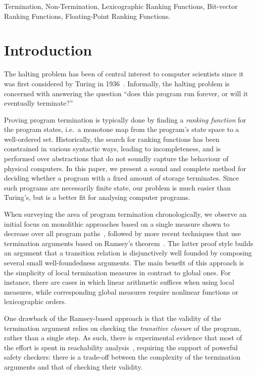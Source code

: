 \documentclass[a4paper]{llncs}
\begin{document}

\keywords
Termination, Non-Termination, 
Lexicographic Ranking Functions, Bit-vector Ranking Functions, Floating-Point Ranking Functions.



\section{Introduction}\label{sec:intro}

The halting problem has been of central interest to computer scientists
since it was first considered by Turing in 1936~\cite{turing}.  Informally,
the halting problem is concerned with answering the question
``does this program run forever, or will it eventually terminate?''

Proving program termination is typically done by finding a \emph{ranking
function} for the program states, i.e.~a monotone map from the program's
state space to a well-ordered set.  Historically, the search for ranking
functions has been constrained in various syntactic ways, leading to
incompleteness, and is performed over abstractions that do not soundly
capture the behaviour of physical computers.  In this paper, we present a
sound and complete method for deciding whether a program with a fixed amount of
storage terminates.  Since such programs are necessarily finite state, our
problem is much easier than Turing's, but is a better fit for analysing computer
programs.

When surveying the area of program termination chronologically, we observe
an initial focus on monolithic approaches based on a single measure shown to
decrease over all program
paths~\cite{DBLP:conf/vmcai/P04,DBLP:conf/cav/BradleyMS05}, followed by more
recent techniques that use termination arguments based on Ramsey's
theorem~\cite{DBLP:conf/lpe/CodishG03,DBLP:conf/lics/PodelskiR04,DBLP:conf/pldi/CookPR06}.
The latter proof style builds an argument that a transition relation is disjunctively well founded
by composing several small well-foundedness arguments.
The main benefit of this approach is
the simplicity of local termination measures in contrast to global ones. 
For instance, there are cases in which linear arithmetic suffices when using
local measures, while corresponding global measures require nonlinear
functions or lexicographic orders.

One drawback of the Ramsey-based approach is that the validity of the
termination argument relies on checking the \emph{transitive closure} of the
program, rather than a single step.  As such, there is experimental evidence
that most of the effort is spent in reachability
analysis~\cite{DBLP:conf/pldi/CookPR06,DBLP:conf/cav/KroeningSTW10},
requiring the support of powerful safety checkers: there is a trade-off
between the complexity of the termination arguments and that of checking
their validity.
\end{document}

